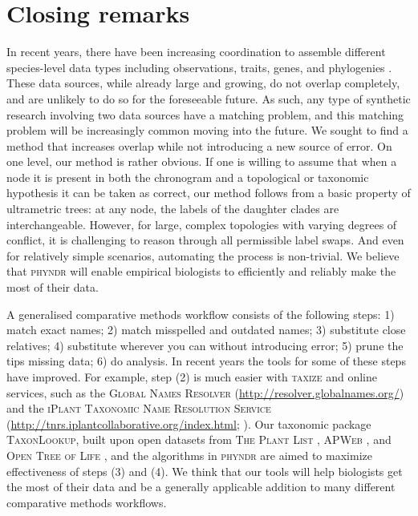 \documentclass[a4paper,11pt]{article}
\begin{document}
\section{Closing remarks}

In recent years, there have been increasing coordination to assemble different species-level data types including observations, traits, genes, and phylogenies \citep{Parr2012}.  These data sources, while already large and growing, do not overlap completely, and are unlikely to do so for the foreseeable future.  As such, any type of synthetic research involving two data sources have a matching problem, and this matching problem will be increasingly common moving into the future.  We sought to find a method that increases overlap while not introducing a new source of error.  On one level, our method is rather obvious. If one is willing to assume that when a node it is present in both the chronogram and a topological or taxonomic hypothesis it can be taken as correct, our method follows from a basic property of ultrametric trees: at any node, the labels of the daughter clades are interchangeable. However, for large, complex topologies with varying degrees of conflict, it is challenging to reason through all permissible label swaps. And even for relatively simple scenarios, automating the process is non-trivial. We believe that \textsc{phyndr} will enable empirical biologists to efficiently and reliably make the most of their data.

A generalised comparative methods workflow consists of the following steps:  1) match exact names; 2) match misspelled and outdated names; 3) substitute close relatives; 4) substitute wherever you can without introducing error; 5) prune the tips missing data; 6) do analysis.  In recent years the tools for some of these steps have improved.  For example, step (2) is much easier with \textsc{taxize} \citep{taxize} and online services, such as the \textsc{Global Names Resolver} (\url{http://resolver.globalnames.org/}) and the \textsc{iPlant Taxonomic Name Resolution Service} (\url{http://tnrs.iplantcollaborative.org/index.html}; \citealt{tnrs}).  Our taxonomic package \textsc{TaxonLookup}, built upon open datasets from \textsc{The Plant List} \citep{ThePlantList}, \textsc{APWeb} \citep{apweb}, and \textsc{Open Tree of Life} \citep{OpenTree}, and the algorithms in \textsc{phyndr} are aimed to maximize effectiveness of steps (3) and (4). We think that our tools will help biologists get the most of their data and be a generally applicable addition to many different comparative methods workflows.
\end{document}
